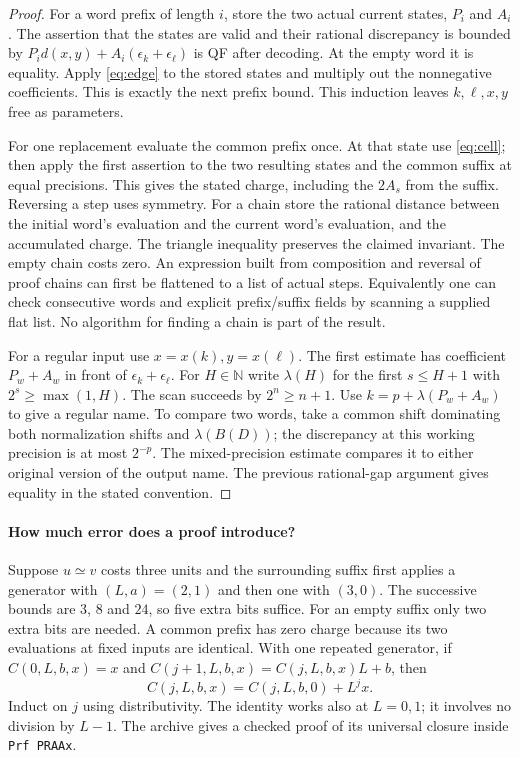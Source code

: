\begin{proof}
For a word prefix of length $i$, store the two actual current states, $P_i$ and $A_i$. The assertion that the states are valid and their rational discrepancy is bounded by $P_i d(x,y)+A_i(\epsilon_k+\epsilon_\ell)$ is QF after decoding. At the empty word it is equality. Apply \eqref{eq:edge} to the stored states and multiply out the nonnegative coefficients. This is exactly the next prefix bound. This induction leaves $k,\ell,x,y$ free as parameters.

For one replacement evaluate the common prefix once. At that state use \eqref{eq:cell}; then apply the first assertion to the two resulting states and the common suffix at equal precisions. This gives the stated charge, including the $2A_s$ from the suffix. Reversing a step uses symmetry. For a chain store the rational distance between the initial word's evaluation and the current word's evaluation, and the accumulated charge. The triangle inequality preserves the claimed invariant. The empty chain costs zero. An expression built from composition and reversal of proof chains can first be flattened to a list of actual steps. Equivalently one can check consecutive words and explicit prefix/suffix fields by scanning a supplied flat list. No algorithm for finding a chain is part of the result.

For a regular input use $x=x(k),y=x(\ell)$. The first estimate has coefficient $P_w+A_w$ in front of $\epsilon_k+\epsilon_\ell$. For $H\in\mathbb N$ write $\lambda(H)$ for the first $s\le H+1$ with $2^s\ge\max(1,H)$. The scan succeeds by $2^n\ge n+1$. Use $k=p+\lambda(P_w+A_w)$ to give a regular name. To compare two words, take a common shift dominating both normalization shifts and $\lambda(B(D))$; the discrepancy at this working precision is at most $2^{-p}$. The mixed-precision estimate compares it to either original version of the output name. The previous rational-gap argument gives equality in the stated convention.
\end{proof}

\paragraph{How much error does a proof introduce?}
Suppose $u\simeq v$ costs three units and the surrounding suffix first applies a generator with $(L,a)=(2,1)$ and then one with $(3,0)$. The successive bounds are $3$, $8$ and $24$, so five extra bits suffice. For an empty suffix only two extra bits are needed. A common prefix has zero charge because its two evaluations at fixed inputs are identical. With one repeated generator, if $C(0,L,b,x)=x$ and $C(j+1,L,b,x)=C(j,L,b,x)L+b$, then
\[
 C(j,L,b,x)=C(j,L,b,0)+L^j x .
\]
Induct on $j$ using distributivity. The identity works also at $L=0,1$; it involves no division by $L-1$. The archive gives a checked proof of its universal closure inside \texttt{Prf PRAAx}.

